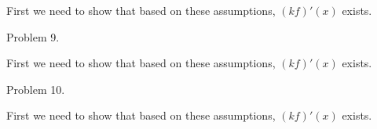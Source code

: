 \documentclass{article}
\begin{document}
  \vspace{1cm}

  First we need to show that based on these assumptions, $(kf)'(x)$ exists.

  \pagebreak

  {\Large \color{Sepia} Problem 9.  }

  \vspace{1cm}

  First we need to show that based on these assumptions, $(kf)'(x)$ exists.

  \pagebreak

  {\Large \color{Sepia} Problem 10.  }

  \vspace{1cm}

  First we need to show that based on these assumptions, $(kf)'(x)$ exists.

  \pagebreak
\end{document}
